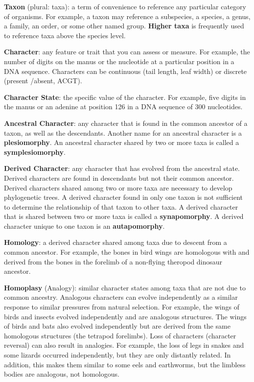 \documentclass[letterpaper]{tufte-handout}
\begin{document}
\textbf{Taxon} (plural: taxa): a term of convenience to reference any particular category of organisms. For example, a taxon may reference a subspecies, a species, a genus, a family, an order, or some other named group. \textbf{Higher taxa} is frequently used to reference taxa above the species level.

\textbf{Character}: any feature or trait that you can assess or measure.  For example, the number of digits on the manus or the nucleotide at a particular position in a DNA sequence.  Characters can be continuous (tail length, leaf width) or discrete (present /absent, ACGT).

\textbf{Character State}: the specific value of the character. For example, five digits in the manus or an adenine at position 126 in a DNA sequence of 300 nucleotides. 

\textbf{Ancestral Character}: any character that is found in the common ancestor of a taxon, as well as the descendants.  Another name for an ancestral character is a \textbf{plesiomorphy}. An ancestral character shared by two or more taxa is called a \textbf{symplesiomorphy}.

\textbf{Derived Character}: any character that has evolved from the ancestral state. Derived characters are found in descendants but not their common ancestor. Derived characters shared among two or more taxa are necessary to develop phylogenetic trees.  A derived character found in only one taxon is not sufficient to determine the relationship of that taxon to other taxa.  A derived character that is shared between two or more taxa is called a \textbf{synapomorphy}.  A derived character unique to one taxon is an \textbf{autapomorphy}.

\textbf{Homology}: a derived character shared among taxa due to descent from a common ancestor. For example, the bones in bird wings are homologous with and derived from the bones in the forelimb of a non-flying theropod dinosaur ancestor.

\textbf{Homoplasy} (Analogy): similar character states among taxa that are not due to common ancestry. Analogous characters can evolve independently as a similar response to similar pressures from natural selection. For example, the wings of birds and insects evolved independently and are analogous structures.  The wings of birds and bats also evolved independently but are derived from the same homologous structures (the tetrapod forelimbs). Loss of characters (character reversal) can also result in analogies. For example, the loss of legs in snakes and some lizards occurred independently, but they are only distantly related. In addition, this makes them similar to some eels and earthworms, but the limbless bodies are analogous, not homologous. 
\end{document}
